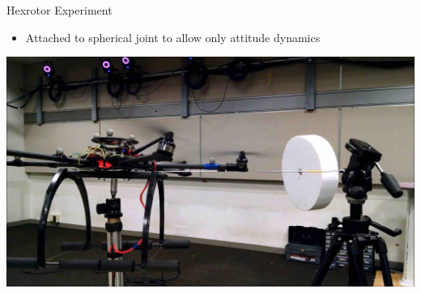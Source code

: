 \begin{frame}{Hexrotor Experiment} %
\begin{itemize}
    \item Attached to spherical joint to allow only attitude dynamics
\end{itemize}
\begin{center}
    \href{https://youtu.be/dsmAbwQram4?t=20s}{\includegraphics[height=0.7\textheight]{figures/2016_IJCAS/hexrotor}}
\end{center}
\end{frame}   %


